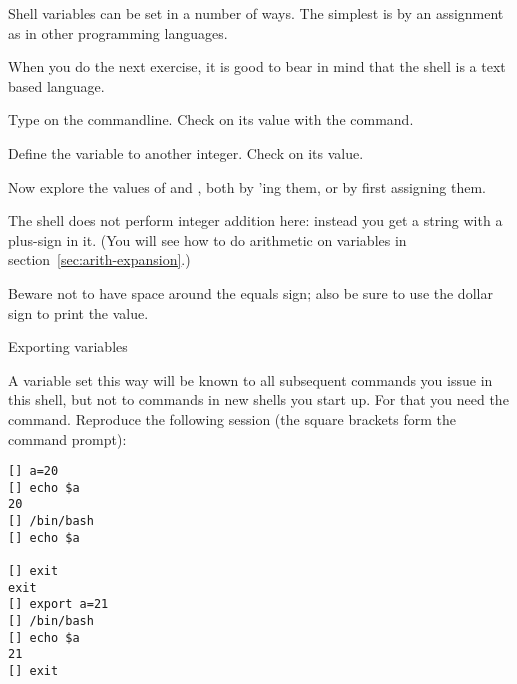 Shell variables can be set in a number of ways. The simplest
is by an assignment as in other programming languages.

When you do the next exercise,
it is good to bear in mind that the shell is a text based language.

\begin{exercise}
  Type  on the commandline. Check on its value with the  command.

  Define the variable  to another integer. Check on its value.

  Now explore the values of  and , both by 'ing them,
  or by first assigning them.
\end{exercise}
\begin{outcome}
  The shell does not perform integer addition here: instead you get a string
  with a plus-sign in it.
  (You will see how to do arithmetic on variables in section~\ref{sec:arith-expansion}.)
\end{outcome}
\begin{caution}
  Beware not to have space
    around the equals sign; also be sure to use the dollar sign to print
    the value.
\end{caution}

 {Exporting variables}

A variable set this way will be known to all subsequent commands
you issue in this shell, but not to commands in new shells you start up.
For that you need the  command.
Reproduce the following session (the square brackets form the command prompt):
\begin{verbatim}
[] a=20
[] echo $a
20
[] /bin/bash
[] echo $a

[] exit
exit
[] export a=21
[] /bin/bash
[] echo $a
21
[] exit
\end{verbatim}

